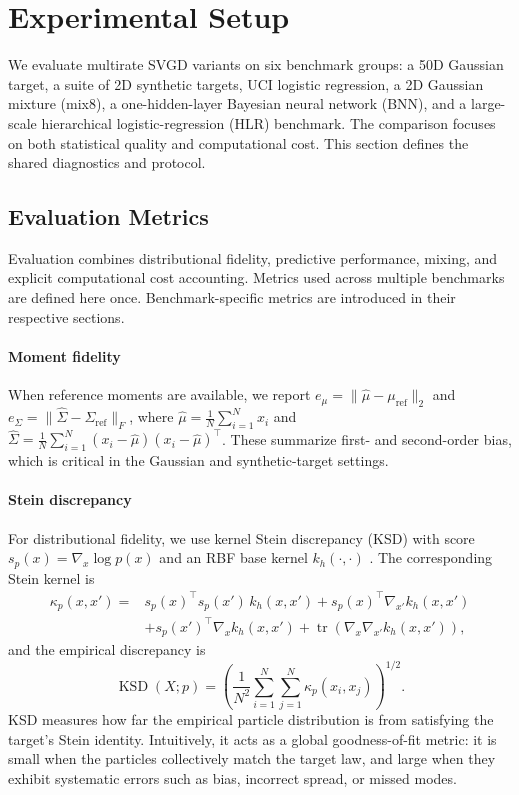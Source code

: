 \section{Experimental Setup}
\label{sec:exp_setup}

We evaluate multirate SVGD variants on six benchmark groups: a 50D Gaussian
target, a suite of 2D synthetic targets, UCI logistic regression, a 2D Gaussian
mixture (mix8), a one-hidden-layer Bayesian neural network (BNN), and a
large-scale hierarchical logistic-regression (HLR) benchmark. The comparison
focuses on both statistical quality and computational cost. This section defines
the shared diagnostics and protocol.

\subsection{Evaluation Metrics}

Evaluation combines distributional fidelity, predictive performance, mixing, and
explicit computational cost accounting. Metrics used across multiple
benchmarks are defined here once. Benchmark-specific metrics are introduced
in their respective sections.

\paragraph{Moment fidelity}
When reference moments are available, we report
$e_\mu=\|\hat\mu-\mu_{\mathrm{ref}}\|_2$ and
$e_\Sigma=\|\hat\Sigma-\Sigma_{\mathrm{ref}}\|_F$, where
$\hat\mu=\frac{1}{N}\sum_{i=1}^N x_i$ and
$\hat\Sigma=\frac{1}{N}\sum_{i=1}^N(x_i-\hat\mu)(x_i-\hat\mu)^\top$.
These summarize first- and second-order bias, which is critical in the
Gaussian and synthetic-target settings.

\paragraph{Stein discrepancy}
For distributional fidelity, we use kernel Stein discrepancy (KSD) with score
$s_p(x)=\nabla_x \log p(x)$ and an RBF base kernel $k_h(\cdot,\cdot)$
\cite{liu2016ksd,pmlr-v70-gorham17a}. The corresponding Stein kernel is
\begin{equation}
\begin{aligned}
\kappa_p(x,x')={}&s_p(x)^\top s_p(x')\,k_h(x,x')
+s_p(x)^\top \nabla_{x'} k_h(x,x') \\
&+s_p(x')^\top \nabla_x k_h(x,x')
+\operatorname{tr}\!\left(\nabla_x\nabla_{x'}k_h(x,x')\right),
\end{aligned}
\label{eq:ksd-stein-kernel}
\end{equation}
and the empirical discrepancy is
\begin{equation}
\operatorname{KSD}(X;p)=
\left(\frac{1}{N^2}\sum_{i=1}^{N}\sum_{j=1}^{N}\kappa_p(x_i,x_j)\right)^{1/2}.
\label{eq:ksd-metric}
\end{equation}
KSD measures how far the empirical particle distribution is from satisfying the
target's Stein identity. Intuitively, it acts as a global goodness-of-fit
metric: it is small when the particles collectively match the target law, and
large when they exhibit systematic errors such as bias, incorrect spread, or
missed modes.

